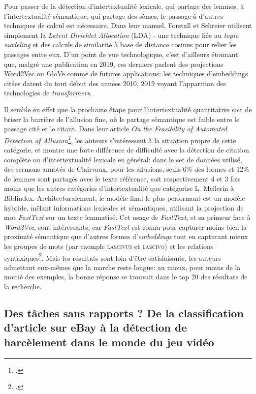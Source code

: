 Pour passer de la détection d'intertextualité lexicale, qui partage des lemmes, à l'intertextualité sémantique, qui partage des sèmes, le passage à d'autres techniques de calcul est nécessaire. Dans leur manuel, Forstall et Schreier utilisent simplement la \textit{Latent Dirichlet Allocation} (LDA) - une technique liée au \textit{topic modeling} et des calculs de similarité à base de distance cosinus pour relier les passages entre eux. D'un point de vue technologique, c'est d'ailleurs étonnant que, malgré une publication en 2019, ces derniers parlent des projections Word2Vec ou GloVe comme de futures applications: les techniques d'embeddings citées datent du tout début des années 2010, 2019 voyant l'apparition des technologies de \textit{transformers}. 

Il semble en effet que la prochaine étape pour l'intertextualité quantitative soit de briser la barrière de l'allusion fine, où le partage sémantique est faible entre le passage cité et le citant. Dans leur article \textit{On the Feasibility of Automated Detection of Allusion\footcite{manjavacas_feasibility_2019}}, les auteurs s'intéressent à la situation propre de cette catégorie, et montre une forte différence de difficulté avec la détection de citation complète ou d'intertextualité lexicale en général: dans le set de données utilisé, des sermons annotés de Clairvaux, pour les allusions, seuls 6\% des formes et 12\% de lemmes sont partagés avec le texte référence, soit respectivement 4 et 3 fois moins que les autres catégories d'intertextualité que catégorise L. Mellerin à Biblindex. Architecturalement, le modèle final le plus performant est un modèle hybride, mêlant informations lexicales et sémantiques, utilisant la projection de mot \textit{FastText} sur un texte lemmatisé. Cet usage de \textit{FastText}, et sa primeur face à \textit{Word2Vec}, sont intéressants, car \textit{FastText} est connu pour capturer moins bien la proximité sémantique que d'autres formes d'\textit{embeddings} tout en capturant mieux les groupes de mots (par exemple \textsc{lascivus} et \textsc{lascivo}) et les relations syntaxiques\footcite{hartmann_portuguese_nodate}. Mais les résultats sont loin d'être satisfaisants, les auteurs admettant eux-mêmes que la marche reste longue: au mieux, pour moins de la moitié des exemples, la bonne réponse se trouvait dans le top 20 des résultats de la recherche. 


\subsection{Des tâches sans rapports ? De la classification d'article sur eBay à la détection de harcèlement dans le monde du jeu vidéo}

